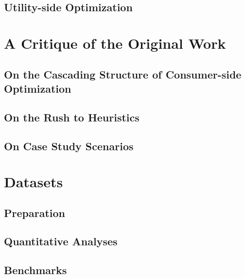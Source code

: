 \documentclass[journal, a4paper]{IEEEtran}
\begin{document}
\subsection{Utility-side Optimization}
\label{subsecL I. Utility-side Optimization}

\section{A Critique of the Original Work}
\label{sec: A Critique of the Original Work}


\lipsum[48]

\subsection{On the Cascading Structure of Consumer-side Optimization}
\label{subsec: II. On the Cascading Structure of Consumer-side Optimization}

\subsection{On the Rush to Heuristics}
\label{subsec: II. On the Rush to Heuristics}

\subsection{On Case Study Scenarios}
\label{subsec: II. On Case Study Scenarios}

\section{Datasets}
\label{sec: Datasets}


\lipsum[32]

\subsection{Preparation}
\label{subsec: III. Preparation}

\subsection{Quantitative Analyses}
\label{subsec: III. Quantitative Analyses}

\subsection{Benchmarks}
\label{subsec: III. Benchmarks}
\end{document}
